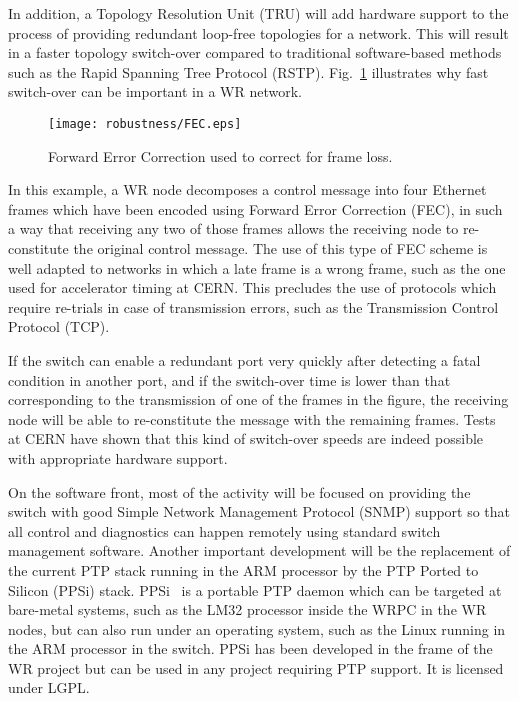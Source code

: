 \documentclass{../JAC2003}
\begin{document}
In addition, a Topology Resolution Unit (TRU) will add hardware
support to the process of providing redundant loop-free topologies for
a network. This will result in a faster topology switch-over compared
to traditional software-based methods such as the Rapid Spanning Tree
Protocol (RSTP). Fig.~\ref{fec-fig} illustrates why fast switch-over
can be important in a WR network.

\begin{figure}[htb]
   \centering
   \texttt{[image: robustness/FEC.eps]}
   \caption{Forward Error Correction used to correct for frame loss.}
   \label{fec-fig}
\end{figure}

In this example, a WR node decomposes a control message into four
Ethernet frames which have been encoded using Forward Error Correction
(FEC), in such a way that receiving any two of those frames allows the
receiving node to re-constitute the original control message. The use
of this type of FEC scheme is well adapted to networks in which a late
frame is a wrong frame, such as the one used for accelerator timing at
CERN. This precludes the use of protocols which require re-trials in
case of transmission errors, such as the Transmission Control Protocol
(TCP).

If the switch can enable a redundant port very quickly after detecting
a fatal condition in another port, and if the switch-over time is
lower than that corresponding to the transmission of one of the frames
in the figure, the receiving node will be able to re-constitute the
message with the remaining frames. Tests at CERN have shown that this
kind of switch-over speeds are indeed possible with appropriate
hardware support.

On the software front, most of the activity will be focused on
providing the switch with good Simple Network Management Protocol
(SNMP) support so that all control and diagnostics can happen remotely
using standard switch management software. Another important
development will be the replacement of the current PTP stack running
in the ARM processor by the PTP Ported to Silicon (PPSi)
stack. PPSi~\cite{ppsi-ref} is a portable PTP daemon which can be
targeted at bare-metal systems, such as the LM32 processor inside the
WRPC in the WR nodes, but can also run under an operating system, such
as the Linux running in the ARM processor in the switch. PPSi has been
developed in the frame of the WR project but can be used in any
project requiring PTP support. It is licensed under LGPL. 
\end{document}
